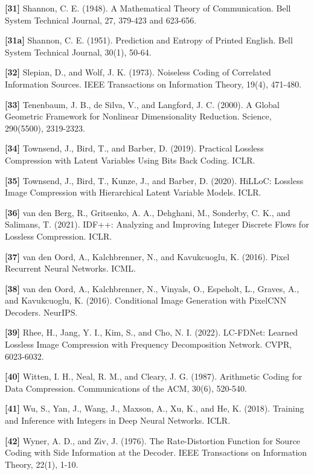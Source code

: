 \documentclass[
]{article}
\begin{document}
\textbf{{[}31{]}} Shannon, C. E. (1948). A Mathematical Theory of
Communication. Bell System Technical Journal, 27, 379-423 and 623-656.

\textbf{{[}31a{]}} Shannon, C. E. (1951). Prediction and Entropy of
Printed English. Bell System Technical Journal, 30(1), 50-64.

\textbf{{[}32{]}} Slepian, D., and Wolf, J. K. (1973). Noiseless Coding
of Correlated Information Sources. IEEE Transactions on Information
Theory, 19(4), 471-480.

\textbf{{[}33{]}} Tenenbaum, J. B., de Silva, V., and Langford, J. C.
(2000). A Global Geometric Framework for Nonlinear Dimensionality
Reduction. Science, 290(5500), 2319-2323.

\textbf{{[}34{]}} Townsend, J., Bird, T., and Barber, D. (2019).
Practical Lossless Compression with Latent Variables Using Bits Back
Coding. ICLR.

\textbf{{[}35{]}} Townsend, J., Bird, T., Kunze, J., and Barber, D.
(2020). HiLLoC: Lossless Image Compression with Hierarchical Latent
Variable Models. ICLR.

\textbf{{[}36{]}} van den Berg, R., Gritsenko, A. A., Dehghani, M.,
Sonderby, C. K., and Salimans, T. (2021). IDF++: Analyzing and Improving
Integer Discrete Flows for Lossless Compression. ICLR.

\textbf{{[}37{]}} van den Oord, A., Kalchbrenner, N., and Kavukcuoglu,
K. (2016). Pixel Recurrent Neural Networks. ICML.

\textbf{{[}38{]}} van den Oord, A., Kalchbrenner, N., Vinyals, O.,
Espeholt, L., Graves, A., and Kavukcuoglu, K. (2016). Conditional Image
Generation with PixelCNN Decoders. NeurIPS.

\textbf{{[}39{]}} Rhee, H., Jang, Y. I., Kim, S., and Cho, N. I. (2022).
LC-FDNet: Learned Lossless Image Compression with Frequency
Decomposition Network. CVPR, 6023-6032.

\textbf{{[}40{]}} Witten, I. H., Neal, R. M., and Cleary, J. G. (1987).
Arithmetic Coding for Data Compression. Communications of the ACM,
30(6), 520-540.

\textbf{{[}41{]}} Wu, S., Yan, J., Wang, J., Maxson, A., Xu, K., and He,
K. (2018). Training and Inference with Integers in Deep Neural Networks.
ICLR.

\textbf{{[}42{]}} Wyner, A. D., and Ziv, J. (1976). The Rate-Distortion
Function for Source Coding with Side Information at the Decoder. IEEE
Transactions on Information Theory, 22(1), 1-10.
\end{document}
